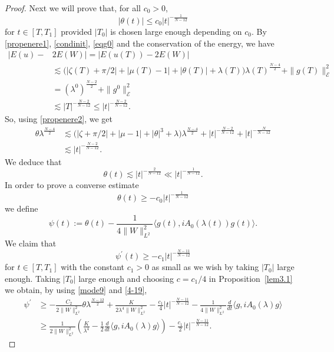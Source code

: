 \documentclass[a4paper,two-side,10pt]{amsart}
\numberwithin{equation}{section}
\begin{document}
\begin{proof}
Next we will prove that, for all $c_0>0$,
\begin{equation}\label{(4-18)}
|\theta(t)|\le c_0|t|^{-\frac{1}{N-12}}
\end{equation}
for $t\in [T,T_1]$ provided $|T_0|$ is chosen large enough depending on $c_0$.
By \eqref{propenere1}, \eqref{condinit}, \eqref{eqg0} and the conservation of the energy, we have
\begin{align*}
|E(u)- &2E(W)|=|E(u(T))-2E(W)|\\
&\lesssim \big(|\zeta (T) +\pi /2| +|\mu (T) -1| +|\theta (T)| +\lambda (T) \big)\lambda (T)^{\frac{N-4}{2}} +\|g(T)\|_{\mathcal{E}}^2\\
&=(\lambda^0)^{\frac{N-2}{2}}+\|g^0\|_{\mathcal{E}}^2\\
&\lesssim |T|^{-\frac{N-2}{N-12}} \le |t|^{-\frac{N-2}{N-12}}.
\end{align*}
So, using \eqref{propenere2}, we get
\begin{align*}
\theta \lambda^{\frac{N-4}{2}}& \lesssim \big(|\zeta +\pi/2|+|\mu -1| +|\theta|^3 +\lambda\big) \lambda^{\frac{N-4}{2}}
+|t|^{-\frac{N-2}{N-12}}+|t|^{-\frac{N}{N-12}}\\
&\lesssim |t|^{-\frac{N-2}{N-12}}.
\end{align*}
We deduce that
\begin{equation}\label{4-19}
\theta(t) \lesssim |t|^{-\frac{2}{N-12}}
\ll |t|^{-\frac{1}{N-12}}.
\end{equation}
In order to prove a converse estimate
\begin{equation}\label{4-20}
\theta(t)\ge -c_0|t|^{-\frac{1}{N-12}}
\end{equation}
we define
\[
\psi(t):=\theta (t) - \dfrac{1}{4\|W\|_{L^2}^2} \langle g(t), i A_0 (\lambda (t)) g(t)\rangle.
\]
We claim that 
\begin{equation}\label{4-21}
\psi^\prime (t)\ge -c_1|t|^{-\frac{N-11}{N-12}}
\end{equation}
for $t\in [T,T_1]$ with the constant $c_1>0$ as small as we wish by taking $|T_0|$ large enough.
Taking $|T_0|$ large enough and choosing $c=c_1/4$ in Proposition~\ref{lem3.1} we obtain, by using \eqref{mode9} and \eqref{4-19}, 
\begin{align}\label{4-22}
\psi^\prime &\geq 
-\frac{C_2}{2\|W\|_{L^2}^2}\theta\lambda^{\frac{N-12}{2}}
+\frac{K}{2\lambda^4 \|W\|_{L^2}^2} -\frac{c_1}{4}|t|^{-\frac{N-11}{N-12}} -\frac{1}{4\|W\|_{L^2}^2}\frac{d}{dt} \langle g, i A_0 (\lambda) g\rangle \nonumber\\
&\geq \frac{1}{2\|W\|_{L^2}^2} \left(\frac{K}{\lambda^4} - \frac{1}{2} \frac{d}{dt} \langle g, iA_0 (\lambda ) g \rangle \right) - \frac{c_1}{2}|t|^{-\frac{N-11}{N-12}}.

\end{align}
\end{proof}
\end{document}
